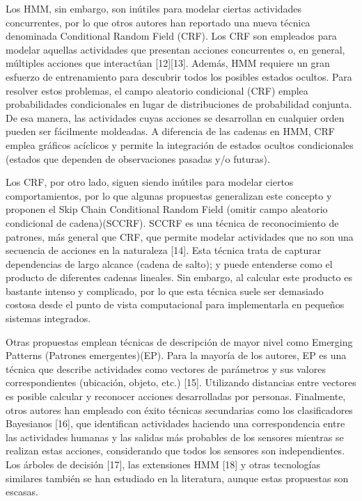 \documentclass{article}
\begin{document}
Los HMM, sin embargo, son inútiles para modelar ciertas actividades concurrentes, por lo que otros autores han reportado una nueva técnica denominada Conditional Random Field (CRF). Los CRF son empleados para modelar aquellas actividades que presentan acciones concurrentes o, en general, múltiples acciones que interactúan [12][13]. Además, HMM requiere un gran esfuerzo de entrenamiento para descubrir todos los posibles estados ocultos. Para resolver estos problemas, el campo aleatorio condicional (CRF) emplea probabilidades condicionales en lugar de distribuciones de probabilidad conjunta. De esa manera, las actividades cuyas acciones se desarrollan en cualquier orden pueden ser fácilmente moldeadas. A diferencia de las cadenas en HMM, CRF emplea gráficos acíclicos y permite la integración de estados ocultos condicionales (estados que dependen de observaciones pasadas y/o futuras).

Los CRF, por otro lado, siguen siendo inútiles para modelar ciertos comportamientos, por lo que algunas propuestas generalizan este concepto y proponen el Skip Chain Conditional Random Field (omitir campo aleatorio condicional de cadena)(SCCRF). SCCRF es una técnica de reconocimiento de patrones, más general que CRF, que permite modelar actividades que no son una secuencia de acciones en la naturaleza [14]. Esta técnica trata de capturar dependencias de largo alcance (cadena de salto); y puede entenderse como el producto de diferentes cadenas lineales. Sin embargo, al calcular este producto es bastante intenso y complicado, por lo que esta técnica suele ser demasiado costosa desde el punto de vista computacional para implementarla en pequeños sistemas integrados.

Otras propuestas emplean técnicas de descripción de mayor nivel como Emerging Patterns (Patrones emergentes)(EP). Para la mayoría de los autores, EP es una técnica que describe actividades como vectores de parámetros y sus valores correspondientes (ubicación, objeto, etc.) [15]. Utilizando distancias entre vectores es posible calcular y reconocer acciones desarrolladas por personas. Finalmente, otros autores han empleado con éxito técnicas secundarias como los clasificadores Bayesianos [16], que identifican actividades haciendo una correspondencia entre las actividades humanas y las salidas más probables de los sensores mientras se realizan estas acciones, considerando que todos los sensores son independientes. Los árboles de decisión [17], las extensiones HMM [18] y otras tecnologías similares también se han estudiado en la literatura, aunque estas propuestas son escasas.
\end{document}
